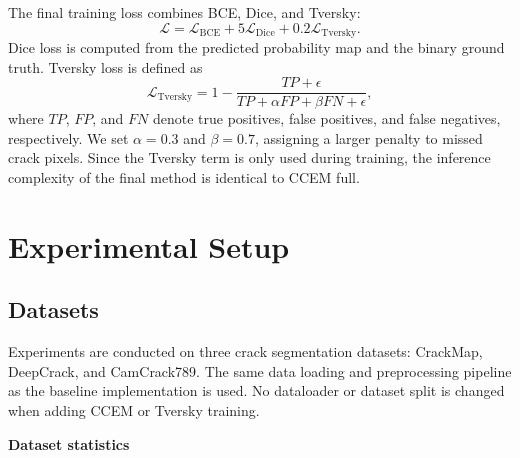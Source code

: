 \documentclass[preprint,12pt]{elsarticle}
\begin{document}
The final training loss combines BCE, Dice, and Tversky:
\begin{equation}
\mathcal{L}=\mathcal{L}_{\mathrm{BCE}}+5\mathcal{L}_{\mathrm{Dice}}+0.2\mathcal{L}_{\mathrm{Tversky}}.
\end{equation}
Dice loss is computed from the predicted probability map and the binary ground truth. Tversky loss is defined as
\begin{equation}
\mathcal{L}_{\mathrm{Tversky}}=1-\frac{TP+\epsilon}{TP+\alpha FP+\beta FN+\epsilon},
\end{equation}
where $TP$, $FP$, and $FN$ denote true positives, false positives, and false negatives, respectively. We set $\alpha=0.3$ and $\beta=0.7$, assigning a larger penalty to missed crack pixels. Since the Tversky term is only used during training, the inference complexity of the final method is identical to CCEM full.

\section{Experimental Setup}
\label{sec:experimental_setup}

\subsection{Datasets}

Experiments are conducted on three crack segmentation datasets: CrackMap, DeepCrack, and CamCrack789. The same data loading and preprocessing pipeline as the baseline implementation is used. No dataloader or dataset split is changed when adding CCEM or Tversky training.

\begin{center}
\centering
\textbf{Dataset statistics}\\[0.5em]
\end{center}
\end{document}
